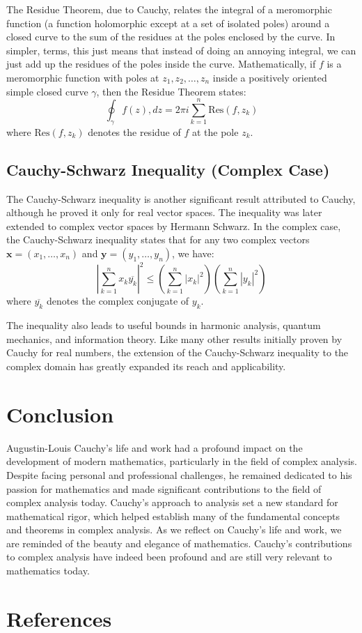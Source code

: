 \documentclass[12pt,letterpaper]{article}
\begin{document}
The Residue Theorem, due to Cauchy, relates the integral of a meromorphic function (a function holomorphic except at a set of isolated poles) around a closed curve to the sum of the residues at the poles enclosed by the curve. 
In simpler, terms, this just means that instead of doing an annoying integral, we can just add up the residues of the poles inside the curve.
Mathematically, if $f$ is a meromorphic function with poles at $z_1, z_2, \ldots, z_n$ inside a positively oriented simple closed curve $\gamma$, then the Residue Theorem states:
$$\oint_\gamma f(z) , dz = 2\pi i \sum_{k=1}^n \text{Res}(f, z_k)$$
where $\text{Res}(f, z_k)$ denotes the residue of $f$ at the pole $z_k$.

\subsection{Cauchy-Schwarz Inequality (Complex Case)}
The Cauchy-Schwarz inequality is another significant result attributed to Cauchy, although he proved it only for real vector spaces. 
The inequality was later extended to complex vector spaces by Hermann Schwarz. 
In the complex case, the Cauchy-Schwarz inequality states that for any two complex vectors $\mathbf{x} = (x_1, \ldots, x_n)$ and $\mathbf{y} = (y_1, \ldots, y_n)$, we have:
$$\left| \sum_{k=1}^n x_k \overline{y_k} \right|^2 \leq \left(\sum_{k=1}^n |x_k|^2\right) \left(\sum_{k=1}^n |y_k|^2\right)$$
where $\overline{y_k}$ denotes the complex conjugate of $y_k$. \cite{BerkeleyNotes}

The inequality also leads to useful bounds in harmonic analysis, quantum mechanics, and information theory. 
Like many other results initially proven by Cauchy for real numbers, the extension of the Cauchy-Schwarz inequality to the complex domain has greatly expanded its reach and applicability.

\section{Conclusion}
Augustin-Louis Cauchy's life and work had a profound impact on the development of modern mathematics, particularly in the field of complex analysis. 
Despite facing personal and professional challenges, he remained dedicated to his passion for mathematics and made significant contributions to the field of complex analysis today.
Cauchy's approach to analysis set a new standard for mathematical rigor, which helped establish many of the fundamental concepts and theorems in complex analysis. 
As we reflect on Cauchy's life and work, we are reminded of the beauty and elegance of mathematics. 
Cauchy's contributions to complex analysis have indeed been profound and are still very relevant to mathematics today.

\section{References}
\printbibliography

\end{document}

